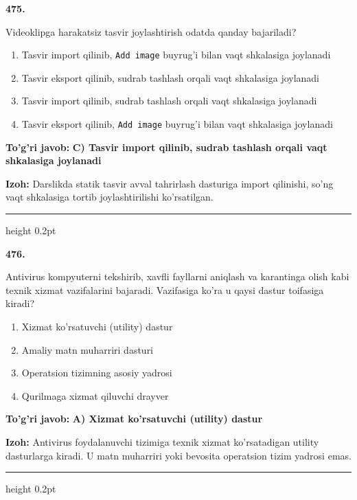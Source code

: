 \documentclass[10pt,a4paper]{article}
\begin{document}
{\bfseries\sffamily\color{ink} 475.}
\par
Videoklipga harakatsiz tasvir joylashtirish odatda qanday bajariladi?
\begin{enumerate}[label=\Alph*),leftmargin=9mm]
\item Tasvir import qilinib, \texttt{Add image} buyrug'i bilan vaqt shkalasiga joylanadi
\item Tasvir eksport qilinib, sudrab tashlash orqali vaqt shkalasiga joylanadi
\item Tasvir import qilinib, sudrab tashlash orqali vaqt shkalasiga joylanadi
\item Tasvir eksport qilinib, \texttt{Add image} buyrug'i bilan vaqt shkalasiga joylanadi
\end{enumerate}
\begin{tcolorbox}[enhanced,breakable,colback=teal!4,colframe=teal!60!black,boxrule=0.45pt,arc=1.2mm,left=2.7mm,right=2.7mm,top=1.8mm,bottom=1.8mm,before skip=2mm,after skip=2mm]
{\bfseries\sffamily\color{teal}To'g'ri javob:} \textbf{C) Tasvir import qilinib, sudrab tashlash orqali vaqt shkalasiga joylanadi}
\par\smallskip
{\bfseries Izoh:} Darslikda statik tasvir avval tahrirlash dasturiga import qilinishi, so'ng vaqt shkalasiga tortib joylashtirilishi ko'rsatilgan.
\end{tcolorbox}
\vspace{2mm}\hrule height 0.2pt\vspace{3mm}

{\bfseries\sffamily\color{ink} 476.}
\par
Antivirus kompyuterni tekshirib, xavfli fayllarni aniqlash va karantinga olish kabi texnik xizmat vazifalarini bajaradi. Vazifasiga ko'ra u qaysi dastur toifasiga kiradi?
\begin{enumerate}[label=\Alph*),leftmargin=9mm]
\item Xizmat ko'rsatuvchi (utility) dastur
\item Amaliy matn muharriri dasturi
\item Operatsion tizimning asosiy yadrosi
\item Qurilmaga xizmat qiluvchi drayver
\end{enumerate}
\begin{tcolorbox}[enhanced,breakable,colback=teal!4,colframe=teal!60!black,boxrule=0.45pt,arc=1.2mm,left=2.7mm,right=2.7mm,top=1.8mm,bottom=1.8mm,before skip=2mm,after skip=2mm]
{\bfseries\sffamily\color{teal}To'g'ri javob:} \textbf{A) Xizmat ko'rsatuvchi (utility) dastur}
\par\smallskip
{\bfseries Izoh:} Antivirus foydalanuvchi tizimiga texnik xizmat ko'rsatadigan utility dasturlarga kiradi. U matn muharriri yoki bevosita operatsion tizim yadrosi emas.
\end{tcolorbox}
\vspace{2mm}\hrule height 0.2pt\vspace{3mm}
\end{document}
